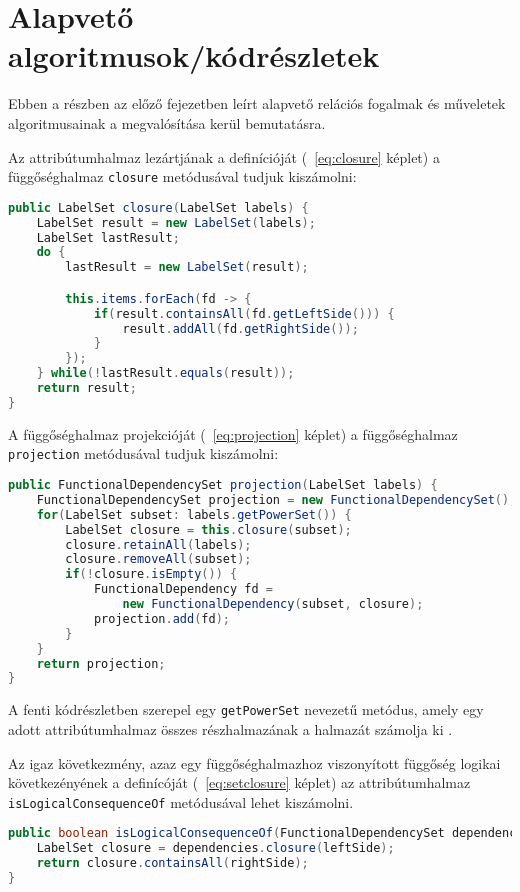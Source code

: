 \section{Alapvető algoritmusok/kódrészletek}

Ebben a részben az előző fejezetben leírt alapvető relációs fogalmak és műveletek algoritmusainak a megvalósítása kerül bemutatásra.

Az attribútumhalmaz lezártjának a definícióját (~\ref{eq:closure} képlet) a függőséghalmaz \lstinline{closure} metódusával tudjuk kiszámolni:

\linespread{1}
\begin{lstlisting}[language=Java]
public LabelSet closure(LabelSet labels) {
	LabelSet result = new LabelSet(labels);
	LabelSet lastResult;
	do {
		lastResult = new LabelSet(result);

		this.items.forEach(fd -> {
			if(result.containsAll(fd.getLeftSide())) {
				result.addAll(fd.getRightSide());
			}
		});
	} while(!lastResult.equals(result));
	return result;
}
\end{lstlisting}

A függőséghalmaz projekcióját (~\ref{eq:projection} képlet) a függőséghalmaz \lstinline{projection} metódusával tudjuk kiszámolni:

\linespread{1}
\begin{lstlisting}[language=Java]
public FunctionalDependencySet projection(LabelSet labels) {
	FunctionalDependencySet projection = new FunctionalDependencySet();
	for(LabelSet subset: labels.getPowerSet()) {
		LabelSet closure = this.closure(subset);
		closure.retainAll(labels);
		closure.removeAll(subset);
		if(!closure.isEmpty()) {
			FunctionalDependency fd = 
			    new FunctionalDependency(subset, closure);
			projection.add(fd);
		}
	}
	return projection;
}
\end{lstlisting}

A fenti kódrészletben szerepel egy \lstinline{getPowerSet} nevezetű metódus, amely egy adott attribútumhalmaz összes részhalmazának a halmazát számolja ki \parencite{baeldung2020}.

Az igaz következmény, azaz egy függőséghalmazhoz viszonyított függőség logikai következényének a definícóját (~\ref{eq:setclosure} képlet) az attribútumhalmaz \lstinline{isLogicalConsequenceOf} metódusával lehet kiszámolni.

\linespread{1}
\begin{lstlisting}[float,floatplacement=H,language=Java]
public boolean isLogicalConsequenceOf(FunctionalDependencySet dependencies) {
	LabelSet closure = dependencies.closure(leftSide);
	return closure.containsAll(rightSide);
}
\end{lstlisting}

